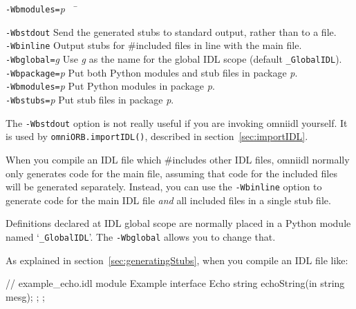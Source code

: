\documentclass[11pt,twoside,a4paper]{book}
\newcommand{\module}[1]{\texttt{#1}}
\newcommand{\op}[1]{\texttt{#1()}}
\newcommand{\cmdline}[1]{\texttt{#1}}
\begin{document}
\begin{tabbing}

\cmdline{-Wbmodules=}\textit{p}~~ \= \kill

\cmdline{-Wbstdout}
     \> Send the generated stubs to standard output, rather than to a
        file.\\

\cmdline{-Wbinline}
     \> Output stubs for \#included files in line with the main
        file.\\

\cmdline{-Wbglobal=}\textit{g}
     \> Use \textit{g} as the name for the global IDL scope (default
        \module{\_GlobalIDL}).\\

\cmdline{-Wbpackage=}\textit{p}
     \> Put both Python modules and stub files in package
        \textit{p}.\\

\cmdline{-Wbmodules=}\textit{p}
     \> Put Python modules in package \textit{p}.\\

\cmdline{-Wbstubs=}\textit{p}
     \> Put stub files in package \textit{p}.\\

\end{tabbing}


The \cmdline{-Wbstdout} option is not really useful if you are
invoking omniidl yourself. It is used by \op{omniORB.importIDL},
described in section~\ref{sec:importIDL}.

When you compile an IDL file which \#includes other IDL files, omniidl
normally only generates code for the main file, assuming that code for
the included files will be generated separately. Instead, you can use
the \cmdline{-Wbinline} option to generate code for the main IDL file
\emph{and} all included files in a single stub file.

Definitions declared at IDL global scope are normally placed in a
Python module named `\module{\_GlobalIDL}'. The \cmdline{-Wbglobal}
allows you to change that.


As explained in section~\ref{sec:generatingStubs}, when you compile an
IDL file like:

\begin{idllisting}
// example_echo.idl
module Example {
  interface Echo {
    string echoString(in string mesg);
  };
};
\end{idllisting}
\end{document}
